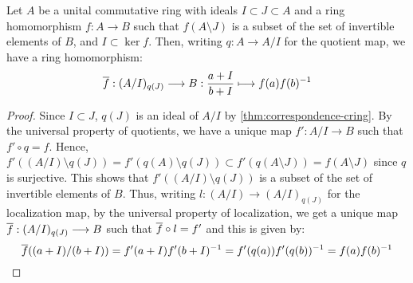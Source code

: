 \begin{lem}\label{lem:loc-quot-ev}
Let $A$ be a unital commutative ring with ideals $I \subset J \subset A$
and a ring homomorphism $f : A \to B$ such that $f(A \setminus J)$
is a subset of the set of invertible elements of $B$, and $I \subset \ker{f}$.
Then, writing $q : A \to A/I$ for the
quotient map, we have a ring homomorphism:
\[
\cls{f} : (A/I)_{q(J)} \to B : \frac{a + I}{b + I} \mapsto f(a)f(b)^{-1}
\]
\end{lem}
\begin{proof}
Since $I \subset J$, $q(J)$ is an ideal of $A/I$ by
\cref{thm:correspondence-cring}.
By the universal property of quotients, we have a unique map
$f' : A/I \to B$ such that $f' \circ q = f$.
Hence,
$f'((A/I) \setminus q(J)) = f'(q(A) \setminus q(J))
\subset f'(q(A \setminus J)) = f(A \setminus J)$ since $q$ is surjective.
This shows that $f'((A/I) \setminus q(J))$ is a subset of the set of invertible
elements of $B$. Thus, writing $l : (A/I) \to (A/I)_{q(J)}$ for
the localization map, by the universal property of localization,
we get a unique map $\cls{f} : (A/I)_{q(J)} \to B$ such that
$\cls{f} \circ l = f'$ and this is given by:
\[
\cls{f}((a + I)/(b + I)) = f'(a + I)f'(b + I)^{-1} = f'(q(a))f'(q(b))^{-1}
= f(a)f(b)^{-1}
\]
\end{proof}
